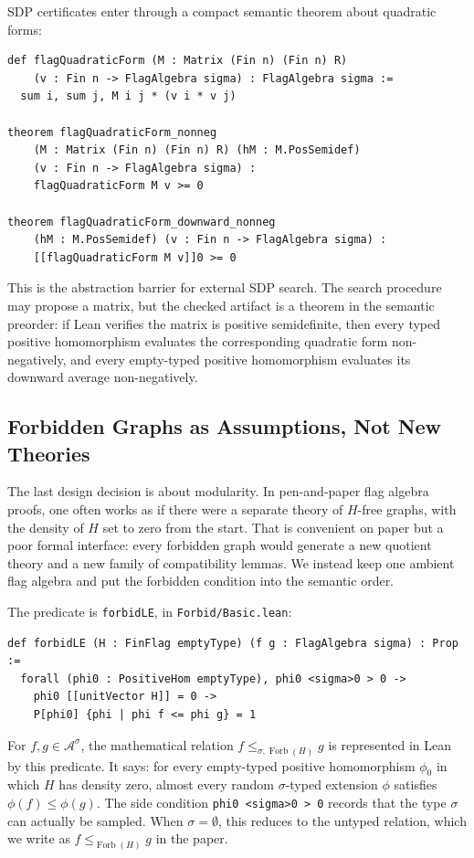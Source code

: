 \documentclass{article}
\newcommand{\forbLE}[1]{\leq_{\operatorname{Forb}(#1)}}
\newcommand{\forbLES}[2]{\leq_{#1,\operatorname{Forb}(#2)}}
\newcommand{\lean}[1]{\texttt{#1}}
\begin{document}
SDP certificates enter through a compact semantic theorem about quadratic
forms:
\begin{lstlisting}
def flagQuadraticForm (M : Matrix (Fin n) (Fin n) R)
    (v : Fin n -> FlagAlgebra sigma) : FlagAlgebra sigma :=
  sum i, sum j, M i j * (v i * v j)

theorem flagQuadraticForm_nonneg
    (M : Matrix (Fin n) (Fin n) R) (hM : M.PosSemidef)
    (v : Fin n -> FlagAlgebra sigma) :
    flagQuadraticForm M v >= 0

theorem flagQuadraticForm_downward_nonneg
    (hM : M.PosSemidef) (v : Fin n -> FlagAlgebra sigma) :
    [[flagQuadraticForm M v]]0 >= 0
\end{lstlisting}
This is the abstraction barrier for external SDP search.  The search procedure
may propose a matrix, but the checked artifact is a theorem in the semantic
preorder: if Lean verifies the matrix is positive semidefinite, then every
typed positive homomorphism evaluates the corresponding quadratic form
non-negatively, and every empty-typed positive homomorphism evaluates its
downward average non-negatively.

\subsection{Forbidden Graphs as Assumptions, Not New Theories}
\label{sec:forbidden}

The last design decision is about modularity.  In pen-and-paper flag algebra
proofs, one often works as if there were a separate theory of $H$-free graphs,
with the density of $H$ set to zero from the start.  That is convenient on
paper but a poor formal interface: every forbidden graph would generate a new
quotient theory and a new family of compatibility lemmas.  We instead keep one
ambient flag algebra and put the forbidden condition into the semantic order.

The predicate is \lean{forbidLE}, in \lean{Forbid/Basic.lean}:
\begin{lstlisting}
def forbidLE (H : FinFlag emptyType) (f g : FlagAlgebra sigma) : Prop :=
  forall (phi0 : PositiveHom emptyType), phi0 <sigma>0 > 0 ->
    phi0 [[unitVector H]] = 0 ->
    P[phi0] {phi | phi f <= phi g} = 1
\end{lstlisting}
For $f,g\in\mathcal{A}^\sigma$, the mathematical relation
$f \forbLES{\sigma}{H} g$ is represented in Lean by this predicate.  It says:
for every empty-typed positive homomorphism $\phi_0$ in which $H$ has density
zero, almost every random $\sigma$-typed extension $\phi$ satisfies
$\phi(f)\leq\phi(g)$.  The side condition \lean{phi0 <sigma>0 > 0} records
that the type $\sigma$ can actually be sampled.  When $\sigma=\emptyset$, this
reduces to the untyped relation, which we write as $f \forbLE{H} g$ in the
paper.
\end{document}
